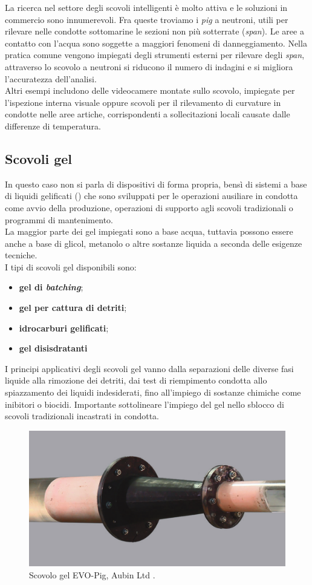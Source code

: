 La ricerca nel settore degli scovoli intelligenti è molto attiva e le soluzioni in commercio sono innumerevoli. Fra queste troviamo i \textit{pig} a neutroni, utili per rilevare nelle condotte sottomarine le sezioni non più sotterrate (\textit{span}). Le aree a contatto con l'acqua sono soggette a maggiori fenomeni di danneggiamento. Nella pratica comune vengono impiegati degli strumenti esterni per rilevare degli \textit{span}, attraverso lo scovolo a neutroni si riducono il numero di indagini e si migliora l'accuratezza dell'analisi.\\
Altri esempi includono delle videocamere montate sullo scovolo, impiegate per l'ispezione interna visuale oppure scovoli per il rilevamento di curvature in condotte nelle aree artiche, corrispondenti a sollecitazioni locali causate dalle differenze di temperatura.

\subsection{Scovoli gel}
In questo caso non si parla di dispositivi di forma propria, bensì di sistemi a base di liquidi gelificati () che sono sviluppati per le operazioni ausiliare in condotta come avvio della produzione, operazioni di supporto agli scovoli tradizionali o programmi di mantenimento.\\
La maggior parte dei gel impiegati sono a base acqua, tuttavia possono essere anche a base di glicol, metanolo o altre sostanze liquida a seconda delle esigenze tecniche.\\
I tipi di scovoli gel disponibili sono:
\begin{itemize}
	\item \textbf{gel di \textit{batching}};
	\item \textbf{gel per cattura di detriti};
	\item \textbf{idrocarburi gelificati};
	\item \textbf{gel disisdratanti}
\end{itemize}

I principi applicativi degli scovoli gel vanno dalla separazioni delle diverse fasi liquide alla rimozione dei detriti, dai test di riempimento condotta allo spiazzamento dei liquidi indesiderati, fino all'impiego di sostanze chimiche come inibitori o biocidi. Importante sottolineare l'impiego del gel nello sblocco di scovoli tradizionali incastrati in condotta.

\begin{figure}[htbp]
	\centering
	\includegraphics[width=.7\textwidth]{fig/pig/gelpig}
	\caption{Scovolo gel EVO-Pig, Aubin Ltd \parencite{johnston2015breaking}.}
	\label{fig:gelpig}
\end{figure}


